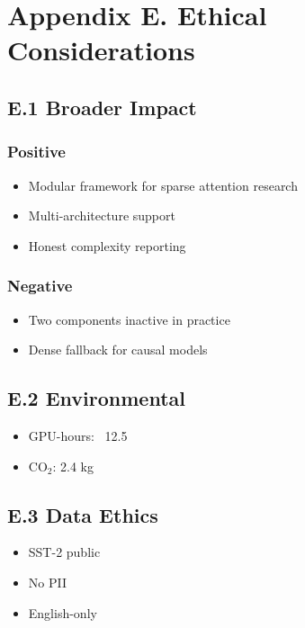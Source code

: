 \section{Appendix E. Ethical Considerations}

\subsection{E.1 Broader Impact}

\subsubsection{Positive}
\begin{itemize}
\item Modular framework for sparse attention research
\item Multi-architecture support
\item Honest complexity reporting

\end{itemize}
\subsubsection{Negative}
\begin{itemize}
\item Two components inactive in practice
\item Dense fallback for causal models

\end{itemize}
\subsection{E.2 Environmental}

\begin{itemize}
\item GPU-hours: ~12.5
\item CO$_2$: 2.4 kg

\end{itemize}
\subsection{E.3 Data Ethics}

\begin{itemize}
\item SST-2 public
\item No PII
\item English-only

\end{itemize}
